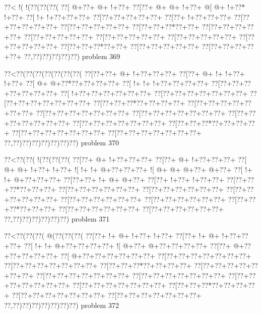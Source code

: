 \vbox{\vbox{\goo
\0??<\- !(\- !(\0??(\0??(\0??(
\0??[\- @+\0??+\- @+\- !+\0??+
\0??[\0??+\- @+\- @+\- !+\0??+
\- @[\- @+\- !+\0??*\- !+\0??+
\0??[\- !+\- !+\0??+\0??+\0??+
\0??[\0??+\0??+\0??+\0??+\0??+
\0??[\0??+\- !+\0??+\0??+\0??+
\0??[\0??+\0??+\0??+\0??+\0??+
\0??[\0??+\0??+\0??+\0??+\0??+
\0??[\0??+\0??+\0??*\0??+\0??+
\0??[\0??+\0??+\0??+\0??+\0??+
\0??[\0??+\0??+\0??+\0??+\0??+
\0??[\0??+\0??+\0??+\0??+\0??+
\0??[\0??+\0??+\0??+\0??+\0??+
\0??[\0??+\0??+\0??+\0??+\0??+
\0??[\0??+\0??+\0??*\0??+\0??+
\0??[\0??+\0??+\0??+\0??+\0??+
\0??[\0??+\0??+\0??+\0??+\0??+
\0??,\0??)\0??)\0??)\0??)\0??)
}
\hfil problem 369\hfil\break
}

\vbox{\vbox{\goo
\0??<\0??(\0??(\0??(\0??(\0??(\0??(\0??(
\0??[\0??+\0??+\- @+\- !+\0??+\0??+\0??+
\0??[\0??+\- @+\- !+\- !+\0??+\- !+\0??+
\0??[\- @+\- @+\0??*\0??+\0??+\0??+\0??+
\0??[\- !+\- !+\- !+\0??+\0??+\0??+\0??+
\0??[\0??+\0??+\0??+\0??+\0??+\0??+\0??+
\0??[\- !+\0??+\0??+\0??+\0??+\0??+\0??+
\0??[\0??+\0??+\0??+\0??+\0??+\0??+\0??+
\0??[\0??+\0??+\0??+\0??+\0??+\0??+\0??+
\0??[\0??+\0??+\0??*\0??+\0??+\0??+\0??+
\0??[\0??+\0??+\0??+\0??+\0??+\0??+\0??+
\0??[\0??+\0??+\0??+\0??+\0??+\0??+\0??+
\0??[\0??+\0??+\0??+\0??+\0??+\0??+\0??+
\0??[\0??+\0??+\0??+\0??+\0??+\0??+\0??+
\0??[\0??+\0??+\0??+\0??+\0??+\0??+\0??+
\0??[\0??+\0??+\0??*\0??+\0??+\0??+\0??+
\0??[\0??+\0??+\0??+\0??+\0??+\0??+\0??+
\0??[\0??+\0??+\0??+\0??+\0??+\0??+\0??+
\0??,\0??)\0??)\0??)\0??)\0??)\0??)\0??)
}
\hfil problem 370\hfil\break
}

\vbox{\vbox{\goo
\0??<\0??(\0??(\- !(\0??(\0??(\0??(
\0??[\0??+\- @+\- !+\0??+\0??+\0??+
\0??[\0??+\- @+\- !+\0??+\0??+\0??+
\0??[\- @+\- @+\- !+\0??+\- !+\0??+
\- ![\- !+\- !+\- @+\0??+\0??+\0??+
\- ![\- @+\- @+\- @+\0??+\- @+\0??+
\0??[\- !+\- !+\- @+\0??+\0??+\0??+
\0??[\0??+\0??+\- !+\- @+\- @+\0??+
\0??[\0??+\- !+\0??+\- !+\0??+\0??+
\0??[\0??+\0??+\0??*\0??+\0??+\0??+
\0??[\0??+\0??+\0??+\0??+\0??+\0??+
\0??[\0??+\0??+\0??+\0??+\0??+\0??+
\0??[\0??+\0??+\0??+\0??+\0??+\0??+
\0??[\0??+\0??+\0??+\0??+\0??+\0??+
\0??[\0??+\0??+\0??+\0??+\0??+\0??+
\0??[\0??+\0??+\0??*\0??+\0??+\0??+
\0??[\0??+\0??+\0??+\0??+\0??+\0??+
\0??[\0??+\0??+\0??+\0??+\0??+\0??+
\0??,\0??)\0??)\0??)\0??)\0??)\0??)
}
\hfil problem 371\hfil\break
}

\vbox{\vbox{\goo
\0??<\0??(\0??(\0??(\- @(\0??(\0??(\0??(
\0??[\0??+\- !+\- @+\- !+\0??+\- !+\0??+
\0??[\0??+\- !+\- @+\- !+\0??+\0??+\0??+
\0??[\- !+\- !+\- @+\0??+\0??+\0??+\0??+
\- ![\- @+\0??+\- @+\0??+\0??+\0??+\0??+
\0??[\0??+\- @+\0??+\0??+\0??+\0??+\0??+
\0??[\- @+\0??+\0??+\0??+\0??+\0??+\0??+
\0??[\0??+\0??+\0??+\0??+\0??+\0??+\0??+
\0??[\0??+\0??+\0??+\0??+\0??+\0??+\0??+
\0??[\0??+\0??+\0??*\0??+\0??+\0??+\0??+
\0??[\0??+\0??+\0??+\0??+\0??+\0??+\0??+
\0??[\0??+\0??+\0??+\0??+\0??+\0??+\0??+
\0??[\0??+\0??+\0??+\0??+\0??+\0??+\0??+
\0??[\0??+\0??+\0??+\0??+\0??+\0??+\0??+
\0??[\0??+\0??+\0??+\0??+\0??+\0??+\0??+
\0??[\0??+\0??+\0??*\0??+\0??+\0??+\0??+
\0??[\0??+\0??+\0??+\0??+\0??+\0??+\0??+
\0??[\0??+\0??+\0??+\0??+\0??+\0??+\0??+
\0??,\0??)\0??)\0??)\0??)\0??)\0??)\0??)
}
\hfil problem 372\hfil\break
}

